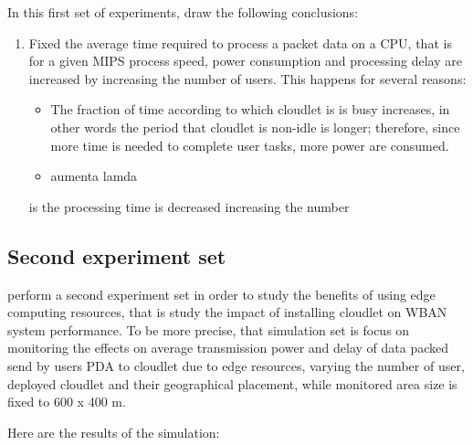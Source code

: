 \documentclass[sigchi]{acmart}
\begin{document}
In this first set of experiments, \citet{MSAReport} draw the following conclusions:

\begin{enumerate}

\item Fixed the average time required to process a packet data on a CPU, that is for a given MIPS process speed, power consumption and processing delay are increased by increasing the number of users. This happens for several reasons:

\begin{itemize}
\item The fraction of time according to which cloudlet is is busy increases, in other words the period that cloudlet is non-idle is longer; therefore, since more time is needed to complete user tasks, more power are consumed.

\item aumenta lamda
\end{itemize} 

is the processing time is decreased increasing the number 



\end{enumerate}





\subsection{Second experiment set}

\citet{MSAReport} perform a second experiment set in order to study the benefits of using edge computing resources, that is study the impact of installing cloudlet on WBAN system performance. 
To be more precise, that simulation set is focus on monitoring the effects on average transmission power and delay of data packed send by users PDA to cloudlet due to edge resources, varying the number of user, deployed cloudlet and their geographical placement, while monitored area size is fixed to 600 x 400 m.

Here are the results of the simulation:
\end{document}
